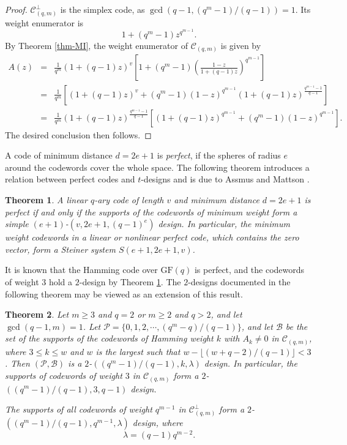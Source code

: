 \documentclass[1p,final]{elsarticle}
\newtheorem{theorem}{Theorem}
\newcommand{\gf}{{\mathrm{GF}}}
\newcommand{\cP}{{\mathcal{P}}}
\newcommand{\cB}{{\mathcal{B}}}
\newcommand{\C}{{\mathcal{C}}}
\begin{document}
\begin{proof}
$\C_{(q,m)}^\perp$ is the simplex code, as $\gcd(q-1, (q^{m}-1)/(q-1))=1$. Its weight enumerator
is
$$
1+(q^m-1)z^{q^{m-1}}.
$$
By Theorem \ref{thm-MI}, the weight enumerator of $\C_{(q,m)}$ is given by
\begin{eqnarray*}
A(z) &=& \frac{1}{q^m} (1+(q-1)z)^{v}\left[ 1 +
             (q^{m}-1) \left(\frac {1-z} {1+(q-1)z}\right)^{q^{m-1}} \right] \\
&=& \frac{1}{q^m} \left[ (1+(q-1)z)^{v} +
             (q^m-1) (1-z)^{q^{m-1}}(1+(q-1)z)^{\frac {q^{m-1}-1}{q-1}} \right] \\
&=& \frac{1}{q^m} (1+(q-1)z)^{\frac {q^{m-1}-1}{q-1}} \left[ (1+(q-1)z)^{q^{m-1}} +
             (q^m-1) (1-z)^{q^{m-1}} \right].
\end{eqnarray*}
The desired conclusion then follows.
\end{proof}

A code of minimum distance $d=2e+1$ is \textit{perfect}, if the spheres of radius 
$e$ around the codewords cover the whole space. The following theorem introduces 
a relation between perfect codes and $t$-designs and is due to Assmus and Mattson 
\cite{AM74}. 

\begin{theorem}\label{thm-perfectcodedesign}
A linear $q$-ary code of length $v$ and minimum distance $d=2e+1$ is perfect if and 
only if the supports of the codewords of minimum weight form a simple $(e+1)$-$(v, 2e+1, 
(q-1)^e)$ design. In particular, the minimum weight codewords in a linear or nonlinear 
perfect code, which contains the zero vector, form a Steiner system $S(e+1, 2e+1, v)$. 
\end{theorem}


It is known that the Hamming code over $\gf(q)$ is perfect, and the codewords of 
weight $3$ hold a $2$-design by Theorem \ref{thm-perfectcodedesign}. The $2$-designs 
documented in the following theorem may be viewed as an extension of this result. 

\begin{theorem}\label{thm-HMdesign171}
Let $m \geq 3$ and $q = 2$ or $m \geq 2$ and $q >2$,  and let $\gcd(q-1, m)=1$. 
Let $\cP=\{0,1,2, \cdots, (q^m-q)/(q-1)\}$, and let $\cB$ be the set of the supports of the codewords of
 Hamming weight $k$ with $A_k \neq 0$ in $\C_{(q,m)}$, where $3 \leq k \leq w$ and $w$ is the 
 largest such that $w-\lfloor (w+q-2)/(q-1) \rfloor < 3$. Then $(\cP, \cB)$ 
is a $2$-$((q^m-1)/(q-1), k, \lambda)$ design. In particular, the supports 
of codewords of weight $3$ in $\C_{(q,m)}$ form a $2$-$((q^m-1)/(q-1), 3, q-1)$ 
design.  

The supports of all codewords of weight $q^{m-1}$ in $\C_{(q,m)}^\perp$ form a 
$2$-$((q^m-1)/(q-1), q^{m-1}, \lambda)$ design, where 
$$ 
\lambda=(q-1)q^{m-2}. 
$$

\end{theorem}
\end{document}
